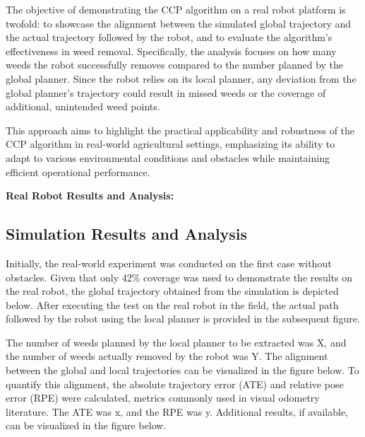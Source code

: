 \vspace*{6mm}   


The objective of demonstrating the CCP algorithm on a real robot platform is twofold: to showcase the alignment between the simulated global trajectory and the actual trajectory followed by the robot, and to evaluate the algorithm's effectiveness in weed removal. Specifically, the analysis focuses on how many weeds the robot successfully removes compared to the number planned by the global planner. Since the robot relies on its local planner, any deviation from the global planner's trajectory could result in missed weeds or the coverage of additional, unintended weed points.

\vspace*{6mm}   


This approach aims to highlight the practical applicability and robustness of the CCP algorithm in real-world agricultural settings, emphasizing its ability to adapt to various environmental conditions and obstacles while maintaining efficient operational performance.

\vspace*{6mm}   


\textbf{Real Robot Results and Analysis:}    

\subsection{Simulation Results and Analysis}

Initially, the real-world experiment was conducted on the first case without obstacles. Given that only 42\% coverage was used to demonstrate the results on the real robot, the global trajectory obtained from the simulation is depicted below. After executing the test on the real robot in the field, the actual path followed by the robot using the local planner is provided in the subsequent figure.

\vspace*{6mm}   


The number of weeds planned by the local planner to be extracted was X, and the number of weeds actually removed by the robot was Y. The alignment between the global and local trajectories can be visualized in the figure below. To quantify this alignment, the absolute trajectory error (ATE) and relative pose error (RPE) were calculated, metrics commonly used in visual odometry literature. The ATE was x, and the RPE was y. Additional results, if available, can be visualized in the figure below.

